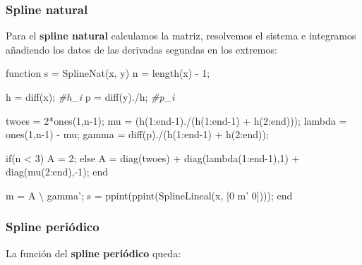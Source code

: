 \documentclass[11pt,spanish,]{article}
\newenvironment{Shaded}{}{}
\newcommand{\FloatTok}[1]{\textcolor[rgb]{0.25,0.63,0.44}{{#1}}}
\newcommand{\CommentTok}[1]{\textcolor[rgb]{0.38,0.63,0.69}{\textit{{#1}}}}
\newcommand{\FunctionTok}[1]{\textcolor[rgb]{0.02,0.16,0.49}{{#1}}}
\newcommand{\NormalTok}[1]{{#1}}
\theoremstyle{definition} \newtheorem*{definicion}{Definición}
\begin{document}
\subsubsection{Spline natural}\label{spline-natural}

Para el \textbf{spline natural} calculamos la matriz, resolvemos el
sistema e integramos añadiendo los datos de las derivadas segundas en
los extremos:

\begin{Shaded}
\begin{Highlighting}[]
\NormalTok{function s = SplineNat(x, y)}
  \NormalTok{n = }\FunctionTok{length}\NormalTok{(x) - }\FloatTok{1}\NormalTok{;}

  \NormalTok{h = }\FunctionTok{diff}\NormalTok{(x);     }\CommentTok{#h_i}
  \NormalTok{p = }\FunctionTok{diff}\NormalTok{(y)./h;  }\CommentTok{#p_i}

  \NormalTok{twoes  = }\FloatTok{2}\NormalTok{*}\FunctionTok{ones}\NormalTok{(}\FloatTok{1}\NormalTok{,n-}\FloatTok{1}\NormalTok{);}
  \NormalTok{mu     = (h(}\FloatTok{1}\NormalTok{:end-}\FloatTok{1}\NormalTok{)./(h(}\FloatTok{1}\NormalTok{:end-}\FloatTok{1}\NormalTok{) + h(}\FloatTok{2}\NormalTok{:end)));}
  \NormalTok{lambda = }\FunctionTok{ones}\NormalTok{(}\FloatTok{1}\NormalTok{,n-}\FloatTok{1}\NormalTok{) - mu;}
  \FunctionTok{gamma}  \NormalTok{= }\FunctionTok{diff}\NormalTok{(p)./(h(}\FloatTok{1}\NormalTok{:end-}\FloatTok{1}\NormalTok{) + h(}\FloatTok{2}\NormalTok{:end));}

  \NormalTok{if(n < }\FloatTok{3}\NormalTok{)}
    \NormalTok{A = }\FloatTok{2}\NormalTok{;}
  \NormalTok{else}
    \NormalTok{A = }\FunctionTok{diag}\NormalTok{(twoes) + }\FunctionTok{diag}\NormalTok{(lambda(}\FloatTok{1}\NormalTok{:end-}\FloatTok{1}\NormalTok{),}\FloatTok{1}\NormalTok{) + }\FunctionTok{diag}\NormalTok{(mu(}\FloatTok{2}\NormalTok{:end),-}\FloatTok{1}\NormalTok{);}
  \NormalTok{end}

  \NormalTok{m = A \textbackslash{} gamma';}
  \NormalTok{s = ppint(ppint(SplineLineal(x, [}\FloatTok{0} \NormalTok{m' }\FloatTok{0}\NormalTok{])));}
\NormalTok{end}
\end{Highlighting}
\end{Shaded}

\subsubsection{Spline periódico}\label{spline-periuxf3dico}

La función del \textbf{spline periódico} queda:
\end{document}
